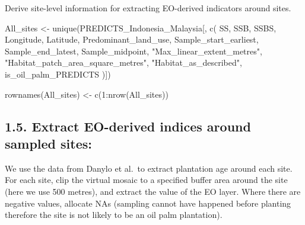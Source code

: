 \documentclass[
  letterpaper,
  DIV=11,
  numbers=noendperiod]{scrartcl}
\newenvironment{Shaded}{\begin{snugshade}}{\end{snugshade}}
\newcommand{\DecValTok}[1]{\textcolor[rgb]{0.68,0.00,0.00}{#1}}
\newcommand{\FunctionTok}[1]{\textcolor[rgb]{0.28,0.35,0.67}{#1}}
\newcommand{\NormalTok}[1]{\textcolor[rgb]{0.00,0.23,0.31}{#1}}
\newcommand{\OtherTok}[1]{\textcolor[rgb]{0.00,0.23,0.31}{#1}}
\newcommand{\SpecialCharTok}[1]{\textcolor[rgb]{0.37,0.37,0.37}{#1}}
\newcommand{\StringTok}[1]{\textcolor[rgb]{0.13,0.47,0.30}{#1}}
\begin{document}
Derive site-level information for extracting EO-derived indicators
around sites.

\begin{Shaded}
\begin{Highlighting}[]
\NormalTok{All\_sites }\OtherTok{\textless{}{-}}
  \FunctionTok{unique}\NormalTok{(PREDICTS\_Indonesia\_Malaysia[, }\FunctionTok{c}\NormalTok{(}
    \StringTok{\textquotesingle{}SS\textquotesingle{}}\NormalTok{,}
    \StringTok{\textquotesingle{}SSB\textquotesingle{}}\NormalTok{,}
    \StringTok{\textquotesingle{}SSBS\textquotesingle{}}\NormalTok{,}
    \StringTok{\textquotesingle{}Longitude\textquotesingle{}}\NormalTok{,}
    \StringTok{\textquotesingle{}Latitude\textquotesingle{}}\NormalTok{,}
    \StringTok{\textquotesingle{}Predominant\_land\_use\textquotesingle{}}\NormalTok{,}
    \StringTok{\textquotesingle{}Sample\_start\_earliest\textquotesingle{}}\NormalTok{,}
    \StringTok{\textquotesingle{}Sample\_end\_latest\textquotesingle{}}\NormalTok{,}
    \StringTok{\textquotesingle{}Sample\_midpoint\textquotesingle{}}\NormalTok{,}
    \StringTok{"Max\_linear\_extent\_metres"}\NormalTok{,}
    \StringTok{"Habitat\_patch\_area\_square\_metres"}\NormalTok{,}
    \StringTok{"Habitat\_as\_described"}\NormalTok{,}
    \StringTok{\textquotesingle{}is\_oil\_palm\_PREDICTS\textquotesingle{}}
\NormalTok{  )])}

\FunctionTok{rownames}\NormalTok{(All\_sites) }\OtherTok{\textless{}{-}} \FunctionTok{c}\NormalTok{(}\DecValTok{1}\SpecialCharTok{:}\FunctionTok{nrow}\NormalTok{(All\_sites))}
\end{Highlighting}
\end{Shaded}

\hypertarget{extract-eo-derived-indices-around-sampled-sites}{%
\subsection{1.5. Extract EO-derived indices around sampled
sites:}\label{extract-eo-derived-indices-around-sampled-sites}}

We use the data from Danylo et al.~to extract plantation age around each
site. For each site, clip the virtual mosaic to a specified buffer area
around the site (here we use 500 metres), and extract the value of the
EO layer. Where there are negative values, allocate NAs (sampling cannot
have happened before planting therefore the site is not likely to be an
oil palm plantation).
\end{document}

